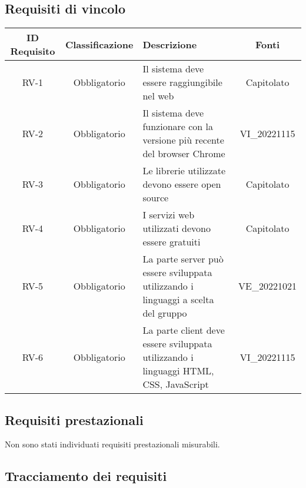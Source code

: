 \subsection{Requisiti di vincolo}
\renewcommand\tabularxcolumn[1]{>{\Centering}m{#1}}
\begin{tabularx}{\textwidth}{| c | c | X | c |} 
 \hline
 \textbf{ID Requisito} & \textbf{Classificazione} & \textbf{Descrizione} & \textbf{Fonti} \\
 \hline
 RV-1 & Obbligatorio &  Il sistema deve essere raggiungibile nel web & Capitolato\\
 \hline
  RV-2 & Obbligatorio & Il sistema deve funzionare con la versione più recente del browser Chrome & VI\_20221115\\
 \hline
 RV-3 & Obbligatorio &  Le librerie utilizzate devono essere open source & Capitolato\\
 \hline
 RV-4 & Obbligatorio & I servizi web utilizzati devono essere gratuiti &  Capitolato\\
 \hline
 RV-5 & Obbligatorio & La parte server può essere sviluppata utilizzando i linguaggi a scelta del gruppo & VE\_20221021\\
 \hline
 RV-6 & Obbligatorio & La parte client deve essere sviluppata utilizzando i linguaggi HTML, CSS, JavaScript & VI\_20221115\\
 \hline
\end{tabularx}

\subsection{Requisiti prestazionali}
Non sono stati individuati requisiti prestazionali misurabili.

\subsection{Tracciamento dei requisiti}

